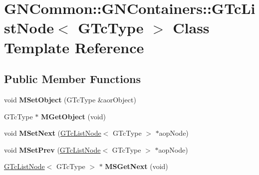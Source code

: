 \hypertarget{class_g_n_common_1_1_g_n_containers_1_1_g_tc_list_node}{}\section{G\+N\+Common\+:\+:G\+N\+Containers\+:\+:G\+Tc\+List\+Node$<$ G\+Tc\+Type $>$ Class Template Reference}
\label{class_g_n_common_1_1_g_n_containers_1_1_g_tc_list_node}
\subsection*{Public Member Functions}
\begin{DoxyCompactItemize}
\item 
\mbox{\label{class_g_n_common_1_1_g_n_containers_1_1_g_tc_list_node_a301b5d7b9d0c1512bbbaa748256e21b5}} 
void {\bfseries M\+Set\+Object} (G\+Tc\+Type \&aor\+Object)
\item 
\mbox{\label{class_g_n_common_1_1_g_n_containers_1_1_g_tc_list_node_ae633d476817929b7f705fbeb44832a74}} 
G\+Tc\+Type $\ast$ {\bfseries M\+Get\+Object} (void)
\item 
\mbox{\label{class_g_n_common_1_1_g_n_containers_1_1_g_tc_list_node_a7701e69daf52b4f3fc332365e7a731fc}} 
void {\bfseries M\+Set\+Next} (\mbox{\hyperlink{class_g_n_common_1_1_g_n_containers_1_1_g_tc_list_node}{G\+Tc\+List\+Node}}$<$ G\+Tc\+Type $>$ $\ast$aop\+Node)
\item 
\mbox{\label{class_g_n_common_1_1_g_n_containers_1_1_g_tc_list_node_a55067d99ca14dd9db64c9bc497902e6f}} 
void {\bfseries M\+Set\+Prev} (\mbox{\hyperlink{class_g_n_common_1_1_g_n_containers_1_1_g_tc_list_node}{G\+Tc\+List\+Node}}$<$ G\+Tc\+Type $>$ $\ast$aop\+Node)
\item 
\mbox{\label{class_g_n_common_1_1_g_n_containers_1_1_g_tc_list_node_a0f17db790ba6e19e20c4de6fc457754b}} 
\mbox{\hyperlink{class_g_n_common_1_1_g_n_containers_1_1_g_tc_list_node}{G\+Tc\+List\+Node}}$<$ G\+Tc\+Type $>$ $\ast$ {\bfseries M\+S\+Get\+Next} (void)

\end{DoxyCompactItemize}
